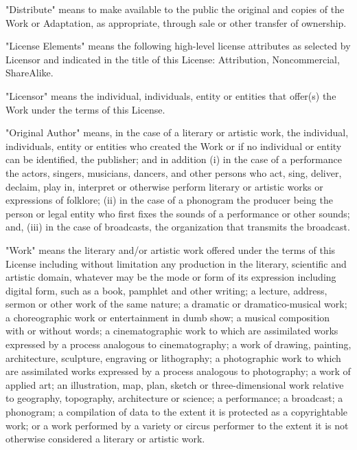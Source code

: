     \item
    "Distribute" means to make available to the public the original and copies of the Work or Adaptation, as appropriate, through sale or other transfer of ownership.

    \item
    "License Elements" means the following high-level license attributes as selected by Licensor and indicated in the title of this License: Attribution, Noncommercial, ShareAlike.

    \item
    "Licensor" means the individual, individuals, entity or entities that offer(s) the Work under the terms of this License.

    \item
    "Original Author" means, in the case of a literary or artistic work, the individual, individuals, entity or entities who created the Work or if no individual or entity can be identified, the publisher; and in addition (i) in the case of a performance the actors, singers, musicians, dancers, and other persons who act, sing, deliver, declaim, play in, interpret or otherwise perform literary or artistic works or expressions of folklore; (ii) in the case of a phonogram the producer being the person or legal entity who first fixes the sounds of a performance or other sounds; and, (iii) in the case of broadcasts, the organization that transmits the broadcast.

    \item
    "Work" means the literary and/or artistic work offered under the terms of this License including without limitation any production in the literary, scientific and artistic domain, whatever may be the mode or form of its expression including digital form, such as a book, pamphlet and other writing; a lecture, address, sermon or other work of the same nature; a dramatic or dramatico-musical work; a choreographic work or entertainment in dumb show; a musical composition with or without words; a cinematographic work to which are assimilated works expressed by a process analogous to cinematography; a work of drawing, painting, architecture, sculpture, engraving or lithography; a photographic work to which are assimilated works expressed by a process analogous to photography; a work of applied art; an illustration, map, plan, sketch or three-dimensional work relative to geography, topography, architecture or science; a performance; a broadcast; a phonogram; a compilation of data to the extent it is protected as a copyrightable work; or a work performed by a variety or circus performer to the extent it is not otherwise considered a literary or artistic work.

